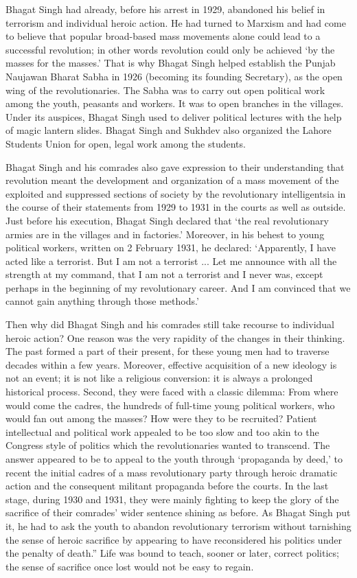 Bhagat Singh had already, before his arrest in 1929, abandoned his belief in terrorism and individual heroic action. He had turned to Marxism and had come to believe that popular broad-based mass movements alone could lead to a successful revolution; in other words revolution could only be achieved `by the masses for the masses.' That is why Bhagat Singh helped establish the Punjab Naujawan Bharat Sabha in 1926 (becoming its founding Secretary), as the open wing of the revolutionaries. The Sabha was to carry out open political work among the youth, peasants and workers. It was to open branches in the villages. Under its auspices, Bhagat Singh used to deliver political lectures with the help of magic lantern slides. Bhagat Singh and Sukhdev also organized the Lahore Students Union for open, legal work among the students.

Bhagat Singh and his comrades also gave expression to their understanding that revolution meant the development and organization of a mass movement of the exploited and suppressed sections of society by the revolutionary intelligentsia in the course of their statements from 1929 to 1931 in the courts as well as outside. Just before his execution, Bhagat Singh declared that `the real revolutionary armies are in the villages and in factories.' Moreover, in his behest to young political workers, written on 2 February 1931, he declared: `Apparently, I have acted like a terrorist. But I am not a terrorist ... Let me announce with all the strength at my command, that I am not a terrorist and I never was, except perhaps in the beginning of my revolutionary career. And I am convinced that we cannot gain anything through those methods.'

Then why did Bhagat Singh and his comrades still take recourse to individual heroic action? One reason was the very rapidity of the changes in their thinking. The past formed a part of their present, for these young men had to traverse decades within a few years. Moreover, effective acquisition of a new ideology is not an event; it is not like a religious conversion: it is always a prolonged historical process. Second, they were faced with a classic dilemma: From where would come the cadres, the hundreds of full-time young political workers, who would fan out among the masses? How were they to be recruited? Patient intellectual and political work appealed to be too slow and too akin to the Congress style of politics which the revolutionaries wanted to transcend. The answer appeared to be to appeal to the youth through `propaganda by deed,' to recent the initial cadres of a mass revolutionary party through heroic dramatic action and the consequent militant propaganda before the courts. In the last stage, during 1930 and 1931, they were mainly fighting to keep the glory of the sacrifice of their comrades' wider sentence shining as before. As Bhagat Singh put it, he had to ask the youth to abandon revolutionary terrorism without tarnishing the sense of heroic sacrifice by appearing to have reconsidered his politics under the penalty of death.'' Life was bound to teach, sooner or later, correct politics; the sense of sacrifice once lost would not be easy to regain.

